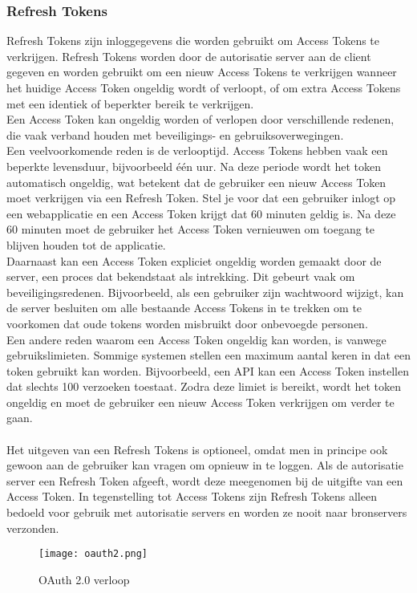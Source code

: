 \subsubsection{Refresh Tokens}%
\label{subsubsec:refresh-tokens}
Refresh Tokens zijn inloggegevens die worden gebruikt om Access Tokens te verkrijgen. Refresh Tokens worden door de autorisatie server aan de client
gegeven en worden gebruikt om een nieuw Access Tokens te verkrijgen wanneer het huidige Access Token ongeldig wordt of verloopt, of om extra Access
Tokens met een identiek of beperkter bereik te verkrijgen. 
\\
Een Access Token kan ongeldig worden of verlopen door verschillende redenen, die vaak verband houden met beveiligings- en gebruiksoverwegingen. 
\\
Een veelvoorkomende reden is de verlooptijd. Access Tokens hebben vaak een beperkte levensduur, bijvoorbeeld één uur. Na deze periode wordt het token
automatisch ongeldig, wat betekent dat de gebruiker een nieuw Access Token moet verkrijgen via een Refresh Token. Stel je voor dat een gebruiker inlogt 
op een webapplicatie en een Access Token krijgt dat 60 minuten geldig is. Na deze 60 minuten moet de gebruiker het Access Token vernieuwen om toegang
te blijven houden tot de applicatie.
\\
Daarnaast kan een Access Token expliciet ongeldig worden gemaakt door de server, een proces dat bekendstaat als intrekking. Dit gebeurt vaak om 
beveiligingsredenen. Bijvoorbeeld, als een gebruiker zijn wachtwoord wijzigt, kan de server besluiten om alle bestaande Access Tokens in te trekken 
om te voorkomen dat oude tokens worden misbruikt door onbevoegde personen.
\\
Een andere reden waarom een Access Token ongeldig kan worden, is vanwege gebruikslimieten. Sommige systemen stellen een maximum aantal keren in dat 
een token gebruikt kan worden. Bijvoorbeeld, een API kan een Access Token instellen dat slechts 100 verzoeken toestaat. Zodra deze limiet is bereikt, 
wordt het token ongeldig en moet de gebruiker een nieuw Access Token verkrijgen om verder te gaan.
\\\\
Het uitgeven van een Refresh Tokens is optioneel, omdat men in principe ook gewoon aan de
gebruiker kan vragen om opnieuw in te loggen.
Als de autorisatie server een Refresh Token afgeeft, wordt deze meegenomen bij de uitgifte van een Access Token. In tegenstelling tot Access Tokens zijn 
Refresh Tokens alleen bedoeld voor gebruik met autorisatie servers en worden ze nooit naar bronservers verzonden.
\begin{figure}[h]
  \centering
  \texttt{[image: oauth2.png]}
  \caption{OAuth 2.0 verloop}\label{fig:example1}
\end{figure}

